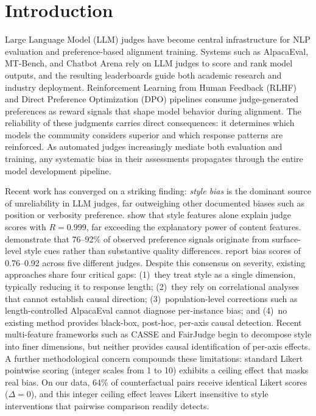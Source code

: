 \section{Introduction}

Large Language Model (LLM) judges have become central infrastructure for NLP evaluation and preference-based alignment training.
Systems such as AlpacaEval, MT-Bench, and Chatbot Arena rely on LLM judges to score and rank model outputs, and the resulting leaderboards guide both academic research and industry deployment.
Reinforcement Learning from Human Feedback (RLHF) and Direct Preference Optimization (DPO) pipelines consume judge-generated preferences as reward signals that shape model behavior during alignment.
The reliability of these judgments carries direct consequences: it determines which models the community considers superior and which response patterns are reinforced.
As automated judges increasingly mediate both evaluation and training, any systematic bias in their assessments propagates through the entire model development pipeline.

Recent work has converged on a striking finding: \emph{style bias} is the dominant source of unreliability in LLM judges, far outweighing other documented biases such as position or verbosity preference.
\citet{murugadoss2025sos} show that style features alone explain judge scores with $R = 0.999$, far exceeding the explanatory power of content features.
\citet{li2026preference} demonstrate that 76--92\% of observed preference signals originate from surface-level style cues rather than substantive quality differences.
\citet{soumik2026judging} report bias scores of 0.76--0.92 across five different judges.
Despite this consensus on severity, existing approaches share four critical gaps: (1)~they treat style as a single dimension, typically reducing it to response length; (2)~they rely on correlational analyses that cannot establish causal direction; (3)~population-level corrections such as length-controlled AlpacaEval \citep{dubois2025lc} cannot diagnose per-instance bias; and (4)~no existing method provides black-box, post-hoc, per-axis causal detection.
Recent multi-feature frameworks such as CASSE \citep{casse2026concise} and FairJudge \citep{wang2026fairjudge} begin to decompose style into finer dimensions, but neither provides causal identification of per-axis effects.
A further methodological concern compounds these limitations: standard Likert pointwise scoring (integer scales from 1 to 10) exhibits a ceiling effect that masks real bias.
On our data, 64\% of counterfactual pairs receive identical Likert scores ($\Delta = 0$), and this integer ceiling effect leaves Likert insensitive to style interventions that pairwise comparison readily detects.

